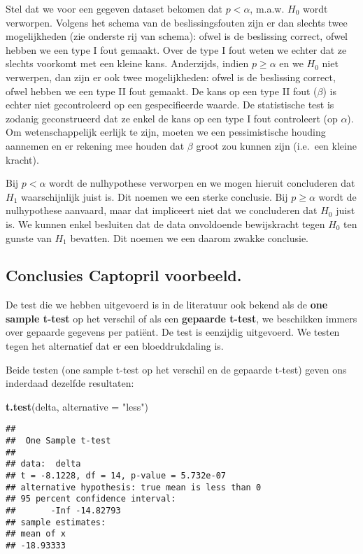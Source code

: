 \documentclass[12pt,dutch,coursenotes]{book}
\newenvironment{Shaded}{\begin{snugshade}}{\end{snugshade}}
\newcommand{\KeywordTok}[1]{\textcolor[rgb]{0.13,0.29,0.53}{\textbf{#1}}}
\newcommand{\DataTypeTok}[1]{\textcolor[rgb]{0.13,0.29,0.53}{#1}}
\newcommand{\StringTok}[1]{\textcolor[rgb]{0.31,0.60,0.02}{#1}}
\newcommand{\NormalTok}[1]{#1}
\theoremstyle{definition}
\theoremstyle{definition}
\theoremstyle{definition}
\theoremstyle{remark}
\begin{document}
Stel dat we voor een gegeven dataset bekomen dat \(p<\alpha\), m.a.w.
\(H_0\) wordt verworpen. Volgens het schema van de beslissingsfouten
zijn er dan slechts twee mogelijkheden (zie onderste rij van schema):
ofwel is de beslissing correct, ofwel hebben we een type I fout gemaakt.
Over de type I fout weten we echter dat ze slechts voorkomt met een
kleine kans. Anderzijds, indien \(p\geq \alpha\) en we \(H_0\) niet
verwerpen, dan zijn er ook twee mogelijkheden: ofwel is de beslissing
correct, ofwel hebben we een type II fout gemaakt. De kans op een type
II fout (\(\beta\)) is echter niet gecontroleerd op een gespecifieerde
waarde. De statistische test is zodanig geconstrueerd dat ze enkel de
kans op een type I fout controleert (op \(\alpha\)). Om wetenschappelijk
eerlijk te zijn, moeten we een pessimistische houding aannemen en er
rekening mee houden dat \(\beta\) groot zou kunnen zijn (i.e.~een kleine
kracht).

Bij \(p < \alpha\) wordt de nulhypothese verworpen en we mogen hieruit
concluderen dat \(H_1\) waarschijnlijk juist is. Dit noemen we een
sterke conclusie. Bij \(p\geq \alpha\) wordt de nulhypothese aanvaard,
maar dat impliceert niet dat we concluderen dat \(H_0\) juist is. We
kunnen enkel besluiten dat de data onvoldoende bewijskracht tegen
\(H_0\) ten gunste van \(H_1\) bevatten. Dit noemen we een daarom zwakke
conclusie.

\subsection{Conclusies Captopril
voorbeeld.}\label{conclusies-captopril-voorbeeld.}

De test die we hebben uitgevoerd is in de literatuur ook bekend als de
\textbf{one sample t-test} op het verschil of als een \textbf{gepaarde
t-test}, we beschikken immers over gepaarde gegevens per patiënt. De
test is eenzijdig uitgevoerd. We testen tegen het alternatief dat er een
bloeddrukdaling is.

Beide testen (one sample t-test op het verschil en de gepaarde t-test)
geven ons inderdaad dezelfde resultaten:

\begin{Shaded}
\begin{Highlighting}[]
\KeywordTok{t.test}\NormalTok{(delta, }\DataTypeTok{alternative =} \StringTok{"less"}\NormalTok{)}
\end{Highlighting}
\end{Shaded}

\begin{verbatim}
## 
##  One Sample t-test
## 
## data:  delta
## t = -8.1228, df = 14, p-value = 5.732e-07
## alternative hypothesis: true mean is less than 0
## 95 percent confidence interval:
##       -Inf -14.82793
## sample estimates:
## mean of x 
## -18.93333
\end{verbatim}
\end{document}
